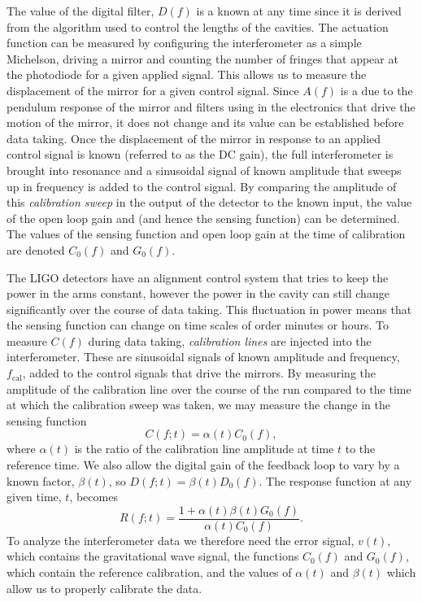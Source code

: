 The value of the digital filter, $D(f)$ is a known at any time since it is
derived from the algorithm used to control the lengths of the cavities.  The
actuation function can be measured by configuring the interferometer as a
simple Michelson, driving a mirror and counting the number of fringes that
appear at the photodiode for a given applied signal. This allows us to measure
the displacement of the mirror for a given control signal.  Since $A(f)$ is a
due to the pendulum response of the mirror and filters using in the
electronics that drive the motion of the mirror, it does not change and its
value can be established before data taking. Once the displacement of the
mirror in response to an applied control signal is known (referred to as the
DC gain), the full interferometer is brought into resonance and a sinusoidal
signal of known amplitude that sweeps up in frequency is added to the control
signal. By comparing the amplitude of this \emph{calibration sweep} in the
output of the detector to the known input, the value of the open loop
gain and (and hence the sensing function) can be determined. The values of the
sensing function and open loop gain at the time of calibration are denoted
$C_0(f)$ and $G_0(f)$.

The LIGO detectors have an alignment control system that tries to keep the
power in the arms constant, however the power in the cavity can still change
significantly over the course of data taking. This fluctuation in power means
that the sensing function can change on time scales of order minutes or hours.
To measure $C(f)$ during data taking, \emph{calibration lines} are injected
into the interferometer. These are sinusoidal signals of known amplitude and
frequency, $f_\mathrm{cal}$, added to the control signals that drive the
mirrors.  By measuring the amplitude of the calibration line over the course
of the run compared to the time at which the calibration sweep was taken, we
may measure the change in the sensing function
\begin{equation}
C(f;t) = \alpha(t) C_0(f),
\end{equation}
where $\alpha(t)$ is the ratio of the calibration line amplitude at time $t$
to the reference time. We also allow the digital gain of the feedback loop to
vary by a known factor, $\beta(t)$, so $D(f;t) = \beta(t) D_0(f)$.
The response function at any given time, $t$, becomes
\begin{equation}
R(f;t) = \frac{1 + \alpha(t)\beta(t)G_0(f)}{\alpha(t)C_0(f)}.
\label{eq:calibration}
\end{equation}
To analyze the interferometer data we therefore need the error signal, $v(t)$,
which contains the gravitational wave signal, the functions $C_0(f)$ and
$G_0(f)$, which contain the reference calibration, and the values of
$\alpha(t)$ and $\beta(t)$ which allow us to properly calibrate the data.

